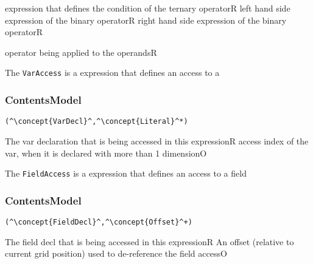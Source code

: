 \begin{HIRChildElements}
	\HIRElementDef{[cond]}
	{expression that defines the condition of the ternary operator}{R}
	\HIRElementDef{[lhs]}
	{left hand side expression of the binary operator}{R}
	\HIRElementDef{[rhs]}
	{right hand side expression of the binary operator}{R}
\end{HIRChildElements}

\begin{HIRAttributes}
	{operator being applied to the operands}{R}
\end{HIRAttributes}


The {\tt VarAccess} is a expression that defines an access to a 

\subsubsection*{ContentsModel}{}

\begin{lstlisting}[style=default]
(^\concept{VarDecl}^,^\concept{Literal}^*)
\end{lstlisting}

\begin{HIRChildElements}
	{The var declaration that is being accessed in this expression}{R}
	{access index of the var, when it is declared with more than 1 dimension}{O}
\end{HIRChildElements}


The {\tt FieldAccess} is a expression that defines an access to a field

\subsubsection*{ContentsModel}{}

\begin{lstlisting}[style=default]
(^\concept{FieldDecl}^,^\concept{Offset}^+)
\end{lstlisting}

\begin{HIRChildElements}
	{The field decl that is being accessed in this expression}{R}
	{An offset (relative to current grid position) used to de-reference the field access}{O}
\end{HIRChildElements}
